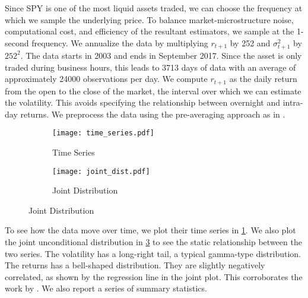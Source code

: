 Since SPY is one of the most liquid assets traded, we can choose the frequency at which we sample the underlying price. To balance market-microstructure noise, computational cost, and efficiency of the resultant estimators, we sample at the \num{1}-second frequency. We annualize the data by multiplying $r_{t+1}$ by \num{252} and $\sigma^2_{t+1}$ by $252^2$. The data starts in 2003 and ends in September 2017. Since the asset is only traded during business hours, this leads to \num{3713} days of data with an average of approximately \num{24000} observations per day. We compute $r_{t+1}$ as the daily return from the open to the close of the market, the interval over which we can estimate the volatility. This avoids specifying the relationship between overnight and intra-day returns. We preprocess the data using the pre-averaging approach as in \textcites{podolskij2009bipower, aitsahalia2012testing}. 

\begin{figure}[htb]

  \centering
  \caption{S\&P 500 Volatility and Log-Return}


  \begin{subfigure}[t]{.54\textwidth}
    \label{risk_fig:spy_dynamics}
    \caption{Time Series}
    \texttt{[image: time\_series.pdf]}
  \end{subfigure}%
%
  \hfill
%
  \begin{subfigure}[t]{.44\textwidth}
    \label{risk_fig:spy_static}
    \caption{Joint Distribution}
    \texttt{[image: joint\_dist.pdf]}
  \end{subfigure}
\end{figure}


To see how the data move over time, we plot their time series in  \cref{risk_fig:spy_dynamics}.  We also plot the joint unconditional distribution in \cref{risk_fig:spy_static} to see the static relationship between the two series. The volatility has a long-right tail, a typical gamma-type distribution. The returns has a bell-shaped distribution. They are slightly negatively correlated, as shown by the regression line in the joint plot. This corroborates the work by \textcites{bandi2012timevarying, aitsahalia2013leverage}. We also report a series of summary statistics.

